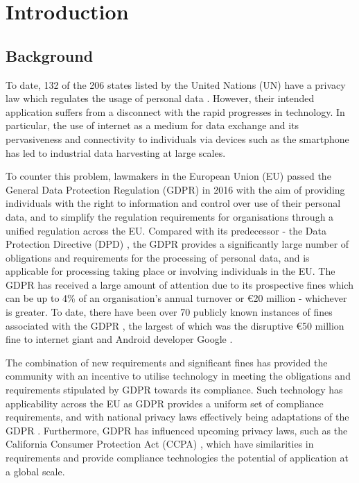 \chapter{Introduction}
\label{chapter:introduction}

\section{Background}
To date, 132 of the 206 states listed by the United Nations (UN) have a privacy law which regulates the usage of personal data \cite{greenleaf_global_2019}.
However, their intended application suffers from a disconnect with the rapid progresses in technology. In particular, the use of internet as a medium for data exchange and its pervasiveness and connectivity to individuals via devices such as the smartphone has led to industrial data harvesting at large scales. 

To counter this problem, lawmakers in the European Union (EU) passed the General Data Protection Regulation (GDPR) \cite{noauthor_regulation_2016} in 2016 with the aim of providing individuals with the right to information and control over use of their personal data, and to simplify the regulation requirements for organisations through a unified regulation across the EU.
Compared with its predecessor - the Data Protection Directive (DPD) \cite{noauthor_directive_1995}, the GDPR provides a significantly large number of obligations and requirements for the processing of personal data, and is applicable for processing taking place or involving individuals in the EU.
The GDPR has received a large amount of attention due to its prospective fines which can be up to 4\% of an organisation's annual turnover or €20 million - whichever is greater. 
To date, there have been over 70 publicly known instances of fines associated with the GDPR \cite{noauthor_gdpr_nodate}, the largest of which was the disruptive €50 million fine to internet giant and Android developer Google \cite{noauthor_cnils_2019}.

The combination of new requirements and significant fines has provided the community with an incentive to utilise technology in meeting the obligations and requirements stipulated by GDPR towards its compliance. 
Such technology has applicability across the EU as GDPR provides a uniform set of compliance requirements, and with national privacy laws effectively being adaptations of the GDPR \cite{mccullagh_national_2019}.
Furthermore, GDPR has influenced upcoming privacy laws, such as the California Consumer Protection Act (CCPA) \cite{noauthor_assembly_2018}, which have similarities in requirements and provide compliance technologies the potential of application at a global scale.


